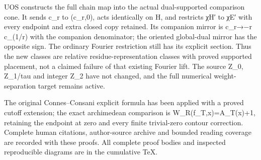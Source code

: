 UOS constructs the full chain map into the actual dual-supported
comparison cone. It sends c\_r to (c\_r,0), acts identically on H, and
restricts χH′ to χE′ with every endpoint and extra closed copy retained.
Its companion mirror is c\_r→−r c\_(1/r) with the companion denominator;
the oriented global-dual mirror has the opposite sign. The ordinary
Fourier restriction still has its explicit section. Thus the new classes
are relative residue-representation classes with proved supported
placement, not a claimed failure of that existing Fourier lift. The
source Z\_0, Z\_1/tau and integer Z\_2 have not changed, and the full
numerical weight-separation target remains active.

The original Connes--Consani explicit formula has been applied with a
proved cutoff extension; the exact archimedean comparison is
W\_R(f\_T,x)=A\_T(x)+1, retaining the endpoint at zero and every finite
trivial-zero contour correction. Complete human citations, author-source
archive and bounded reading coverage are recorded with these proofs. All
complete proof bodies and inspected reproducible diagrams are in the
cumulative TeX.
